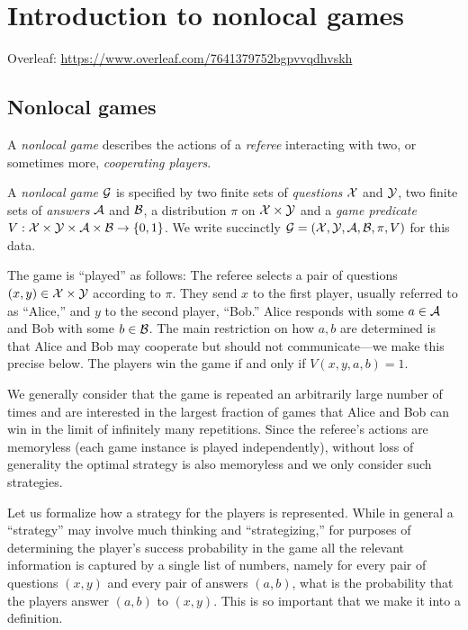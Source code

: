 
\chapter{Introduction to nonlocal games}

Overleaf: \url{https://www.overleaf.com/7641379752bgpvvqdhvskh}

\section{Nonlocal games}

A \emph{nonlocal game} describes the actions of a \emph{referee} interacting with two, or sometimes more, \emph{cooperating players}. 

\begin{definition}
A \emph{nonlocal game} $\mathcal{G}$ is specified by two finite sets of \emph{questions} $\mathcal{X}$ and $\mathcal{Y}$, two finite sets of \emph{answers} $\mathcal{A}$ and $\mathcal{B}$, a distribution $\pi$ on $\mathcal{X}\times \mathcal{Y}$ and a \emph{game predicate} $V: \mathcal{X}\times \mathcal{Y} \times \mathcal{A}\times \mathcal{B} \to \{0,1\}$. We write succinctly $\mathcal{G}=(\mathcal{X},\mathcal{Y},\mathcal{A},\mathcal{B},\pi,V)$ for this data. 
\end{definition}

The game is ``played'' as follows: The referee selects a pair of questions $(x,y)\in\mathcal{X}\times \mathcal{Y}$ according to $\pi$. They send $x$ to the first player, usually referred to as ``Alice,'' and $y$ to the second player, ``Bob.'' Alice responds with some $a\in \mathcal{A}$ and Bob with some $b\in \mathcal{B}$. The main restriction on how $a,b$ are determined is that Alice and Bob may cooperate but should not communicate---we make this precise below. The players win the game if and only if $V(x,y,a,b)=1$. 

We generally consider that the game is repeated an arbitrarily large number of times and are interested in the largest fraction of games that Alice and Bob can win in the limit of infinitely many repetitions. Since the referee's actions are memoryless (each game instance is played independently), without loss of generality the optimal strategy is also memoryless and we only consider such strategies.

Let us formalize how a strategy for the players is represented. While in general a ``strategy'' may involve much thinking and ``strategizing,'' for purposes of determining the player's success probability in the game all the relevant information is captured by a single list of numbers, namely for every pair of questions $(x,y)$ and every pair of answers $(a,b)$, what is the probability that the players answer $(a,b)$ to $(x,y)$. This is so important that we make it into a definition.


